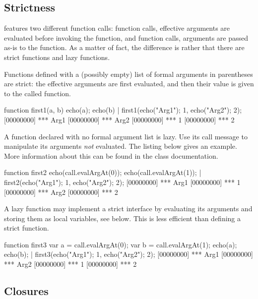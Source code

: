 \subsection{Strictness}

\us features two different function calls: 
function calls, effective arguments are evaluated before invoking the
function, and  function calls, arguments are passed
as-is to the function.  As a matter of fact, the difference is rather that
there are strict functions and lazy functions.

Functions defined with a (possibly empty) list of formal arguments in
parentheses are strict: the effective arguments are first evaluated,
and then their value is given to the called function.

\begin{urbiscript}
function first1(a, b) {
  echo(a); echo(b)
}|
first1({echo("Arg1"); 1},
       {echo("Arg2"); 2});
[00000000] *** Arg1
[00000000] *** Arg2
[00000000] *** 1
[00000000] *** 2
\end{urbiscript}

A function declared with no formal argument list is lazy.  Use its call
message to manipulate its arguments \emph{not} evaluated.  The listing below
gives an example.  More information about this can be found in the
 class documentation.

\begin{urbiscript}
function first2
{
  echo(call.evalArgAt(0));
  echo(call.evalArgAt(1));
}|
first2({echo("Arg1"); 1},
       {echo("Arg2"); 2});
[00000000] *** Arg1
[00000000] *** 1
[00000000] *** Arg2
[00000000] *** 2
\end{urbiscript}

A lazy function may implement a strict interface by evaluating its
arguments and storing them as local variables, see below.  This is
less efficient than defining a strict function.

\begin{urbiscript}
function first3
{
  var a = call.evalArgAt(0);
  var b = call.evalArgAt(1);
  echo(a); echo(b);
}|
first3({echo("Arg1"); 1},
       {echo("Arg2"); 2});
[00000000] *** Arg1
[00000000] *** Arg2
[00000000] *** 1
[00000000] *** 2
\end{urbiscript}

\subsection{Closures}
\label{sec:lang:closure}

